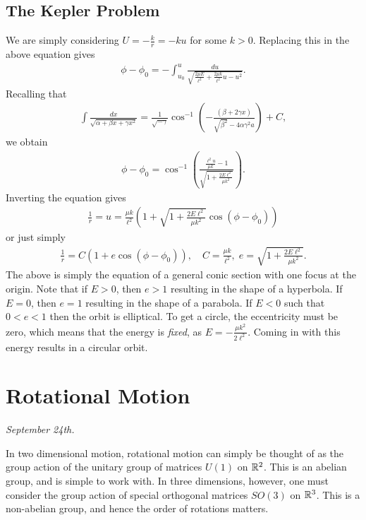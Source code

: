 \subsection{The Kepler Problem}
We are simply considering $U = -\frac{k}{r} = -ku$ for some $k > 0$. Replacing this in the above equation gives
\begin{align}
    \phi - \phi_{0} = -\int_{u_{0}}^{u} \frac{du}{\sqrt{\frac{2\mu E}{\ell^{2}} + \frac{2\mu k}{\ell^{2}}u - u^{2}}}.
\end{align}
Recalling that
\begin{align}
    \int \frac{dx}{\sqrt{\alpha + \beta x + \gamma x^{2}}} = \frac{1}{\sqrt{-\gamma}} \cos^{-1} \left( -\frac{(\beta + 2\gamma x)}{\sqrt{\beta^{2}} - 4\alpha \gamma^{2}a} \right) + C,
\end{align}
we obtain
\begin{align}
    \phi - \phi_{0} = \cos^{-1}\left( \frac{\frac{\ell^{2} u}{\mu k} - 1}{\sqrt{1 + \frac{2 E \ell^{2}}{\mu k^{2}}}} \right).
\end{align}
Inverting the equation gives
\begin{align}
    \frac{1}{r} = u = \frac{\mu k}{\ell^{2}} \left( 1 + \sqrt{1 + \frac{2E \ell^{2}}{\mu k^{2}}} \cos(\phi - \phi_{0}) \right)
\end{align}
or just simply
\begin{align}
    \frac{1}{r} = C\left( 1 + e \cos(\phi - \phi_{0}) \right),\quad C = \frac{\mu k}{\ell^{2}},\; e = \sqrt{1 + \frac{2E \ell^{2}}{\mu k^{2}}}.
\end{align}
The above is simply the equation of a general conic section with one focus at the origin. Note that if $E > 0$, then $e > 1$ resulting in the shape of a hyperbola. If $E = 0$, then $e = 1$ resulting in the shape of a parabola. If $E < 0$ such that $0 < e < 1$ then the orbit is elliptical. To get a circle, the eccentricity must be zero, which means that the energy is \textit{fixed}, as $E = -\frac{\mu k^{2}}{2\ell^{2}}$. Coming in with this energy results in a circular orbit.

\section{Rotational Motion}

\textit{September 24th.}

In two dimensional motion, rotational motion can simply be thought of as the group action of the unitary group of matrices $U(1)$ on $\mathbb{R}^{2}$. This is an abelian group, and is simple to work with. In three dimensions, however, one must consider the group action of special orthogonal matrices $SO(3)$ on $\mathbb{R}^{3}$. This is a non-abelian group, and hence the order of rotations matters.

